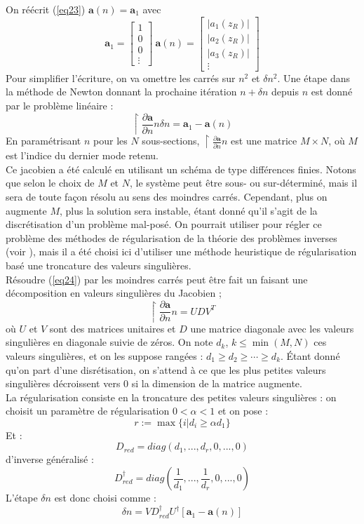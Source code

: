 \documentclass{article}
\begin{document}
On réécrit (\ref{eq23}) $\mathbf{a}(n)=\mathbf{a}_1$ avec \[\mathbf{a}_1=\begin{bmatrix} 1\\0\\0\\ \vdots \end{bmatrix} \ \mathbf{a}(n)=\begin{bmatrix} |a_1(z_R)| \\ |a_2(z_R)| \\ |a_3(z_R)| \\ \vdots \end{bmatrix}\]
Pour simplifier l'écriture, on va omettre les carrés sur $n^2$ et $\delta n^2$. Une étape dans la méthode de Newton donnant la prochaine itération $n+\delta n$ depuis $n$ est donné par le problème linéaire :
\begin{equation}\label{eq24}
	\restriction{\frac{\partial\mathbf{a}}{\partial n}}{n}\delta n=\mathbf{a}_1-\mathbf{a}(n)
\end{equation}
En paramétrisant $n$ pour les $N$ sous-sections, $\restriction{\frac{\partial\mathbf{a}}{\partial n}}{n}$ est une matrice $M\times N$, où $M$ est l'indice du dernier mode retenu.\\
Ce jacobien a été calculé en utilisant un schéma de type différences finies. Notons que selon le choix de $M$ et $N$, le système peut être sous- ou sur-déterminé, mais il sera de toute façon résolu au sens des moindres carrés. Cependant, plus on augmente $M$, plus la solution sera instable, étant donné qu'il s'agit de la discrétisation d'un problème mal-posé. On pourrait utiliser pour régler ce problème des méthodes de régularisation de la théorie des problèmes inverses (voir \cite{engl96regu}), mais il a été choisi ici d'utiliser une méthode heuristique de régularisation basé une troncature des valeurs singulières.\\
Résoudre (\ref{eq24}) par les moindres carrés peut être fait un faisant une décomposition en valeurs singulières du Jacobien ;
	\[\restriction{\frac{\partial\mathbf{a}}{\partial n}}{n}=UDV^T\]
où $U$ et $V$ sont des matrices unitaires et $D$ une matrice diagonale avec les valeurs singulières en diagonale suivie de zéros. On note $d_k$, $k\leq \min(M,N)$ ces valeurs singulières, et on les suppose rangées : $d_1\geq d_2\geq \cdots \geq d_k$. Étant donné qu'on part d'une disrétisation, on s'attend à ce que les plus petites valeurs singulières décroissent vers 0 si la dimension de la matrice augmente.\\
La régularisation consiste en la troncature des petites valeurs singulières : on choisit un paramètre de régularisation $0<\alpha<1$ et on pose :
	\[r:=\max\{i | d_i\geq \alpha d_1\}\]
Et :
	\[D_{red}=diag(d_1,...,d_r,0,...,0)\]
d'inverse généralisé :
	\[D_{red}^\dagger = diag\left( \frac{1}{d_1},...,\frac{1}{d_r},0,...,0\right) \]
L'étape $\delta n$ est donc choisi comme : \begin{equation}\label{eq26}
	\delta n=VD_{red}^\dagger U^\dagger [\mathbf{a}_1-\mathbf{a}(n)]
\end{equation}
\end{document}
